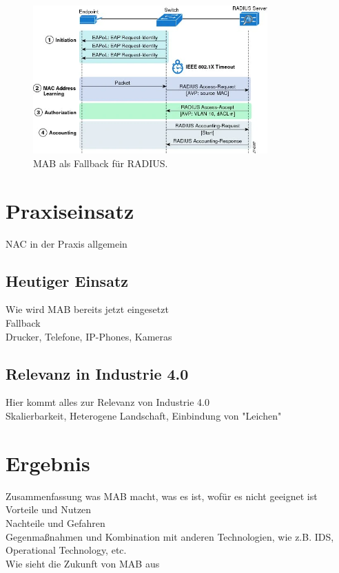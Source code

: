 \documentclass[conference]{IEEEtran}
\begin{document}
\begin{figure}[hbt]
	\centering
	\includegraphics[width=9cm]{figures/mab-fallback}
	\caption{MAB als Fallback für RADIUS.}
\end{figure}

%

\section{Praxiseinsatz}
NAC in der Praxis allgemein

\subsection{Heutiger Einsatz}
Wie wird MAB bereits jetzt eingesetzt\\
Fallback\\
Drucker, Telefone, IP-Phones, Kameras

\subsection{Relevanz in Industrie 4.0}
Hier kommt alles zur Relevanz von Industrie 4.0\\
Skalierbarkeit, Heterogene Landschaft, Einbindung von "Leichen"

%

\section{Ergebnis}
Zusammenfassung was MAB macht, was es ist, wofür es nicht geeignet ist\\
Vorteile und Nutzen\\
Nachteile und Gefahren\\
Gegenmaßnahmen und Kombination mit anderen Technologien, wie z.B. IDS, Operational Technology, etc.\\

Wie sieht die Zukunft von MAB aus

%



\end{document}
